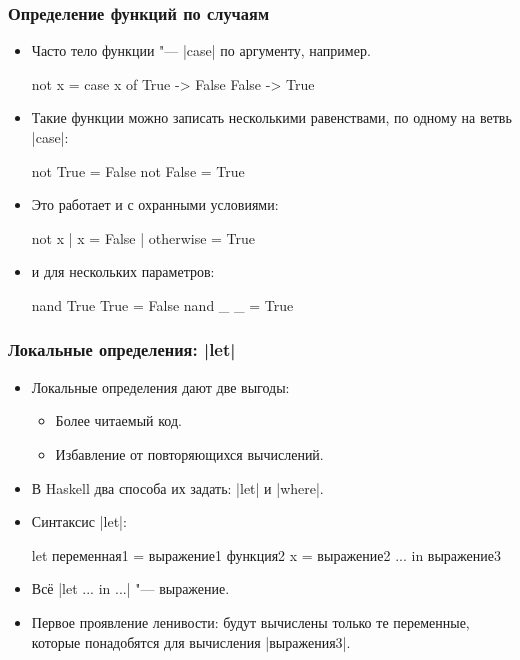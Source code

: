 \documentclass[10pt]{beamer}
\begin{document}
\begin{frame}[fragile]
  \frametitle{Определение функций по случаям}
  \begin{itemize}
    \item Часто тело функции "--- \haskinline|case| по аргументу, например.
          \begin{haskell}
            not x = case x of
                True -> False
                False -> True
          \end{haskell}
    \item Такие функции можно записать несколькими равенствами, по одному на ветвь \haskinline|case|:
          \begin{haskell}
            not True = False
            not False = True
          \end{haskell}
    \item Это работает и с охранными условиями:
          \begin{haskell}
            not x | x = False
                  | otherwise = True
          \end{haskell}
    \item и для нескольких параметров:
          \begin{haskell}
            nand True True = False
            nand _    _ = True
          \end{haskell}
  \end{itemize}
\end{frame}

\begin{frame}[fragile]
  \frametitle{Локальные определения: \haskinline|let|}
  \begin{itemize}
    \item Локальные определения дают две выгоды:
          \begin{itemize}
            \item Более читаемый код.
            \item Избавление от повторяющихся вычислений.
          \end{itemize}
    \item В Haskell два способа их задать: \haskinline|let| и \haskinline|where|.
    \item Синтаксис \haskinline|let|:
          \begin{haskell}
            let переменная1 = выражение1
                функция2 x = выражение2
                ...
            in выражение3
          \end{haskell}
    \item Всё \haskinline|let ... in ...| "--- выражение.
    \item Первое проявление ленивости: будут вычислены только те переменные, которые понадобятся для вычисления \haskinline|выражения3|.
  \end{itemize}
\end{frame}
\end{document}
